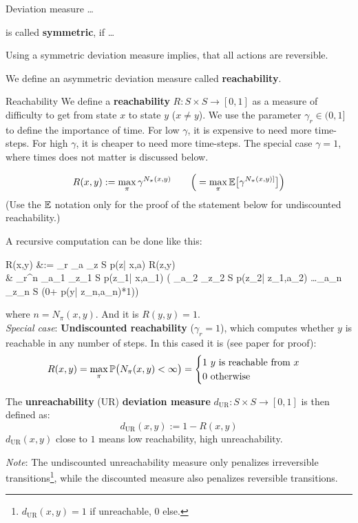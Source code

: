\begin{Definition}{Deviation measure}{}{}
	\dots
	
	is called \textbf{symmetric}, if \dots
\end{Definition}
Using a symmetric deviation measure implies, that all actions are reversible.

We define an asymmetric deviation measure called \textbf{reachability}.


\begin{Definition}{Reachability}{}{}
	We define a \textbf{reachability} $R:S\times S\to[0,1]$ as a measure of difficulty to get from state $x$ to state $y$ ($x\neq y$).
	We use the parameter $\gamma_r\in(0,1]$ to define the importance of time. For low $\gamma$, it is expensive to need more time-steps. For high $\gamma$, it is cheaper to need more time-steps. The special case $\gamma=1$, where times does not matter is discussed below.
	
	\[ R(x,y) := \max_\pi \gamma^{N_{\pi}(x, y)} \qquad \Big(= \max_\pi \mathbb{E}\big[ \gamma^{N_{\pi}(x, y)]} \big] \Big)\]
	(Use the $\mathbb{E}$ notation only for the proof of the statement below for undiscounted reachability.)
	
	A recursive computation can be done like this:
	\begin{flalign*}
		R(x,y) &:= \gamma_r \max\limits_{a} \sum_{z \in S} p(z| \; x,a) R(z,y)\\
		& \gamma_r^{n} \max\limits_{a_1} \sum_{z_1 \in S} p(z_1| \; x,a_1) \Big( \max\limits_{a_2} \sum_{z_2 \in S} p(z_2| \; z_1,a_2) \dots \max\limits_{a_{n}} \sum_{z_{n} \in S} (0+ p(y| \; z_{n},a_{n})*1)\Big)
	\end{flalign*}
	where $n=N_{\pi}(x,y)$. And it is $R(y,y)=1$.\\
	
	\textit{Special case}: \textbf{Undiscounted reachability} ($\gamma_r=1$), which computes whether $y$ is reachable in any number of steps. In this cased it is (see paper for proof):
	\[ R(x,y) = \max_\pi \mathbb{P}\big( N_{\pi}(x,y)<\infty \big)  = \begin{cases}
		1 \ y \text{ is reachable from }x\\
		0 \ \text{otherwise}
	\end{cases}\]	
	
	The \textbf{unreachability} (UR) \textbf{deviation measure} $d_{\text{UR}}:S\times S\to[0,1]$ is then defined as:
	\[ d_{\text{UR}}(x,y) := 1-R(x,y) \]
	$d_{\text{UR}}(x,y)$ close to $1$ means low reachability, high unreachability.
	
	\textit{Note}: The undiscounted unreachability measure only penalizes irreversible transitions\footnote{$d_{\text{UR}}(x,y)=1$ if unreachable, $0$ else.}, while the
	discounted measure also penalizes reversible transitions.
\end{Definition}

